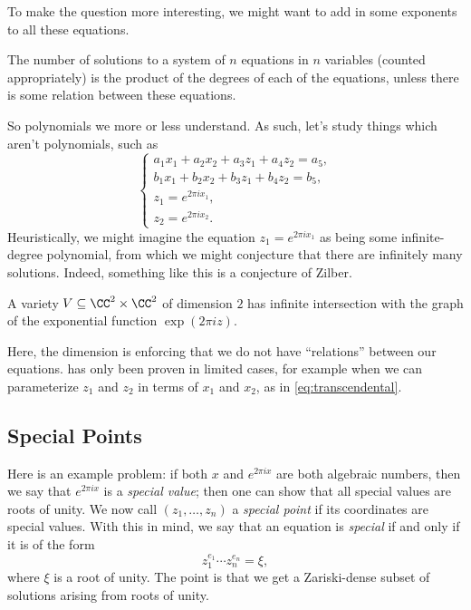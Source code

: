 \documentclass{article}
\begin{document}
To make the question more interesting, we might want to add in some exponents to all these equations.
\begin{theorem}[Bezout]
	The number of solutions to a system of $n$ equations in $n$ variables (counted appropriately) is the product of the degrees of each of the equations, unless there is some relation between these equations.
\end{theorem}
So polynomials we more or less understand. As such, let's study things which aren't polynomials, such as
\begin{equation}
	\begin{cases}
		a_1x_1+a_2x_2+a_3z_1+a_4z_2=a_5, \\
		b_1x_1+b_2x_2+b_3z_1+b_4z_2=b_5, \\
		z_1=e^{2\pi ix_1}, \\
		z_2=e^{2\pi ix_2}.
	\end{cases} \label{eq:transcendental}
\end{equation}
Heuristically, we might imagine the equation $z_1=e^{2\pi ix_1}$ as being some infinite-degree polynomial, from which we might conjecture that there are infinitely many solutions. Indeed, something like this is a conjecture of Zilber.
\begin{conj}[Zilber] \label{conj:zilber}
	A variety $V\subseteq\CC^2\times\CC^2$ of dimension $2$ has infinite intersection with the graph of the exponential function $\exp(2\pi iz)$.
\end{conj}
Here, the dimension is enforcing that we do not have ``relations'' between our equations.  has only been proven in limited cases, for example when we can parameterize $z_1$ and $z_2$ in terms of $x_1$ and $x_2$, as in \eqref{eq:transcendental}.

\subsection{Special Points}
Here is an example problem: if both $x$ and $e^{2\pi ix}$ are both algebraic numbers, then we say that $e^{2\pi ix}$ is a \textit{special value}; then one can show that all special values are roots of unity. We now call $(z_1,\ldots,z_n)$ a \textit{special point} if its coordinates are special values. With this in mind, we say that an equation is \textit{special} if and only if it is of the form
\[z_1^{e_1}\cdots z_n^{e_n}=\xi,\]
where $\xi$ is a root of unity. The point is that we get a Zariski-dense subset of solutions arising from roots of unity.
\end{document}
